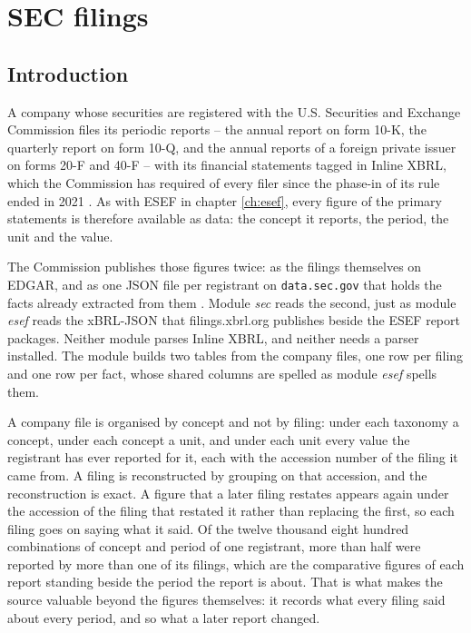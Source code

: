 \chapter{SEC filings}\label{ch:sec}

\section{Introduction}

A company whose securities are registered with the U.S. Securities and Exchange Commission files its periodic reports -- the annual report on form 10-K, the quarterly report on form 10-Q, and the annual reports of a foreign private issuer on forms 20-F and 40-F -- with its financial statements tagged in Inline XBRL, which the Commission has required of every filer since the phase-in of its rule ended in 2021 \parencite{SEC.2018}. As with ESEF in chapter \ref{ch:esef}, every figure of the primary statements is therefore available as data: the concept it reports, the period, the unit and the value.

The Commission publishes those figures twice: as the filings themselves on EDGAR, and as one JSON file per registrant on \verb|data.sec.gov| that holds the facts already extracted from them \parencite{SEC.2026}. Module \emph{sec} reads the second, just as module \emph{esef} reads the xBRL-JSON that filings.xbrl.org publishes beside the ESEF report packages. Neither module parses Inline XBRL, and neither needs a parser installed. The module builds two tables from the company files, one row per filing and one row per fact, whose shared columns are spelled as module \emph{esef} spells them.

A company file is organised by concept and not by filing: under each taxonomy a concept, under each concept a unit, and under each unit every value the registrant has ever reported for it, each with the accession number of the filing it came from. A filing is reconstructed by grouping on that accession, and the reconstruction is exact. A figure that a later filing restates appears again under the accession of the filing that restated it rather than replacing the first, so each filing goes on saying what it said. Of the twelve thousand eight hundred combinations of concept and period of one registrant, more than half were reported by more than one of its filings, which are the comparative figures of each report standing beside the period the report is about. That is what makes the source valuable beyond the figures themselves: it records what every filing said about every period, and so what a later report changed.

